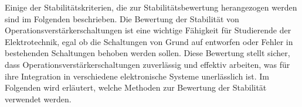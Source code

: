 \begin{frame}
{%
    

    Einige der Stabilitätskriterien, die zur Stabilitätsbewertung herangezogen werden sind im Folgenden beschrieben.
    Die Bewertung der Stabilität von Operationsverstärkerschaltungen ist eine wichtige Fähigkeit für Studierende der Elektrotechnik, egal ob die Schaltungen von Grund auf entworfen oder Fehler in bestehenden Schaltungen behoben werden sollen. 
    Diese Bewertung stellt sicher, dass Operationsverstärkerschaltungen zuverlässig und effektiv arbeiten, was für ihre Integration in verschiedene elektronische Systeme unerlässlich ist. Im Folgenden wird erläutert, welche Methoden zur Bewertung der Stabilität verwendet werden.

}
\end{frame}
